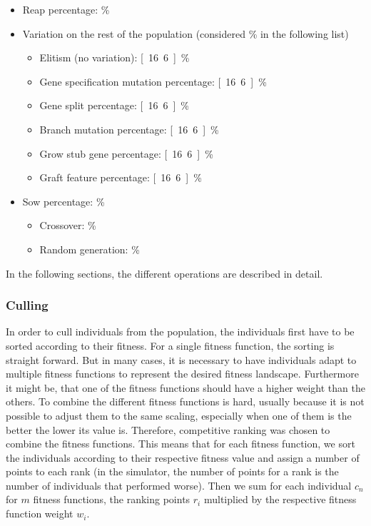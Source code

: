 \documentclass[main]{subfiles}
\begin{document}
\begin{itemize}
\item Reap percentage: \unit[15]{\%}
\item Variation on the rest of the population (considered \unit[100]{\%} in the following list)
\begin{itemize}
\item Elitism (no variation): \unit[16.6]{\%}
\item Gene specification mutation percentage: \unit[16.6]{\%}
\item Gene split percentage: \unit[16.6]{\%}
\item Branch mutation percentage: \unit[16.6]{\%}
\item Grow stub gene percentage: \unit[16.6]{\%}
\item Graft feature percentage: \unit[16.6]{\%}
\end{itemize}
\item Sow percentage: \unit[15]{\%}
\begin{itemize}
\item Crossover: \unit[50]{\%}
\item Random generation: \unit[50]{\%}
\end{itemize}
\label{item:ReaperPerc}
\end{itemize}

In the following sections, the different operations are described in detail.

\subsubsection{Culling}
\label{subsubsection:Culling}

In order to cull individuals from the population, the individuals first have to be sorted according to their fitness. For a single fitness function, the sorting is straight forward. But in many cases, it is necessary to have individuals adapt to multiple fitness functions to represent the desired fitness landscape. Furthermore it might be, that one of the fitness functions should have a higher weight than the others. To combine the different fitness functions is hard, usually because it is not possible to adjust them to the same scaling, especially when one of them is the better the lower its value is. Therefore, competitive ranking was chosen to combine the fitness functions. This means that for each fitness function, we sort the individuals according to their respective fitness value and assign a number of points to each rank (in the simulator, the number of points for a rank is the number of individuals that performed worse). Then we sum for each individual $c_n$ for $m$ fitness functions, the ranking points $r_i$ multiplied by the respective fitness function weight $w_i$. 
\end{document}
